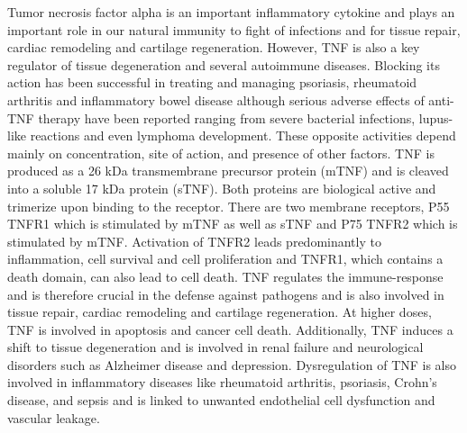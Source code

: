 Tumor necrosis factor alpha is an important inflammatory cytokine and plays an important role in our natural immunity to fight of infections and for tissue repair, cardiac remodeling and cartilage regeneration. However, TNF is also a key regulator of tissue degeneration and several autoimmune diseases. Blocking its action has been successful in treating and managing psoriasis, rheumatoid arthritis and inflammatory bowel disease although serious adverse effects of anti-TNF therapy have been reported ranging from severe bacterial infections, lupus-like reactions and even lymphoma development\cite{Bradley_2007,Tiegs_2022}. These opposite activities depend mainly on concentration, site of action, and presence of other factors. TNF is produced as a 26 kDa transmembrane precursor protein (mTNF) and is cleaved into a soluble 17 kDa protein (sTNF). Both proteins are biological active and trimerize upon binding to the receptor. There are two membrane receptors, P55 TNFR1 which is stimulated by mTNF as well as sTNF and P75 TNFR2 which is stimulated by mTNF. Activation of TNFR2 leads predominantly to inflammation, cell survival and cell proliferation and TNFR1, which contains a death domain, can also lead to cell death\cite{Tiegs_2022,Kalliolias_2015}. TNF regulates the immune-response and is therefore crucial in the defense against pathogens and is also involved in tissue repair, cardiac remodeling and cartilage regeneration. At higher doses, TNF is involved in apoptosis and cancer cell death. Additionally, TNF induces a shift to tissue degeneration and is involved in renal failure and neurological disorders such as Alzheimer disease and depression\cite{Miola_2021,How_Shing_Koy_2021}. Dysregulation of TNF is also involved in inflammatory diseases like rheumatoid arthritis, psoriasis, Crohn's disease, and sepsis\cite{Kalliolias_2015} and is linked to unwanted endothelial cell dysfunction and vascular leakage\cite{Ferrero_2001,Seynhaeve_2006,R_egg_1998}.

